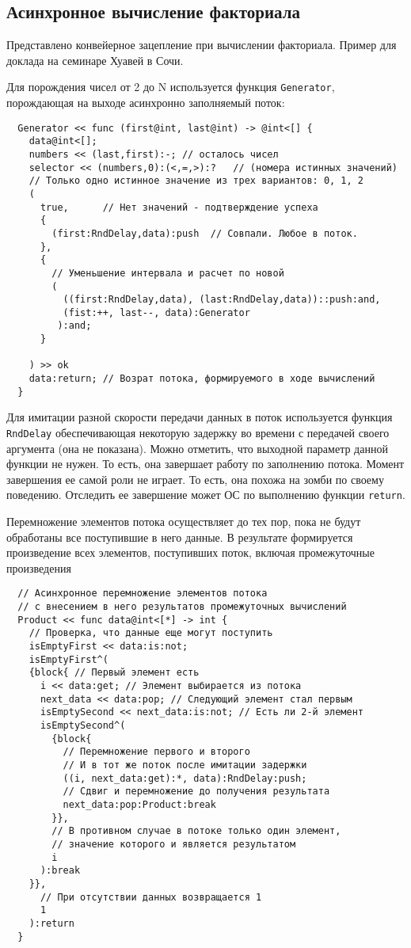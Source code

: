 \subsection{Асинхронное вычисление факториала}

Представлено конвейерное зацепление при вычислении факториала. Пример для доклада на семинаре Хуавей в Сочи.

Для порождения чисел от 2 до N используется функция \verb|Generator|, порождающая на выходе асинхронно заполняемый поток:

\begin{verbatim}
  Generator << func (first@int, last@int) -> @int<[] {
    data@int<[];
    numbers << (last,first):-; // осталось чисел
    selector << (numbers,0):(<,=,>):?   // (номера истинных значений)
    // Только одно истинное значение из трех вариантов: 0, 1, 2
    (
      true,      // Нет значений - подтверждение успеха
      {
        (first:RndDelay,data):push  // Совпали. Любое в поток.
      },
      {
        // Уменьшение интервала и расчет по новой
        (
          ((first:RndDelay,data), (last:RndDelay,data))::push:and,
          (fist:++, last--, data):Generator
         ):and;
      }

    ) >> ok
    data:return; // Возрат потока, формируемого в ходе вычислений
  }
\end{verbatim}
Для имитации разной скорости передачи данных в поток используется функция \verb|RndDelay| обеспечивающая некоторую задержку во времени с передачей своего аргумента (она не показана). Можно отметить, что выходной параметр данной функции не нужен. То есть, она завершает работу по заполнению потока. Момент завершения ее самой роли не играет. То есть, она похожа на зомби по своему поведению. Отследить ее завершение может ОС по выполнению функции \verb|return|.

Перемножение элементов потока осуществляет до тех пор, пока не будут обработаны все поступившие в него данные.
В результате формируется произведение всех элементов, поступивших поток, включая промежуточные произведения
\begin{verbatim}
  // Асинхронное перемножение элементов потока
  // с внесением в него результатов промежуточных вычислений
  Product << func data@int<[*] -> int {
    // Проверка, что данные еще могут поступить
    isEmptyFirst << data:is:not;
    isEmptyFirst^(
    {block{ // Первый элемент есть
      i << data:get; // Элемент выбирается из потока
      next_data << data:pop; // Следующий элемент стал первым
      isEmptySecond << next_data:is:not; // Есть ли 2-й элемент
      isEmptySecond^(
        {block{
          // Перемножение первого и второго
          // И в тот же поток после имитации задержки
          ((i, next_data:get):*, data):RndDelay:push;
          // Сдвиг и перемножение до получения результата
          next_data:pop:Product:break
        }},
        // В противном случае в потоке только один элемент,
        // значение которого и является результатом
        i
      ):break
    }},
      // При отсутствии данных возвращается 1
      1
    ):return
  }
\end{verbatim}

